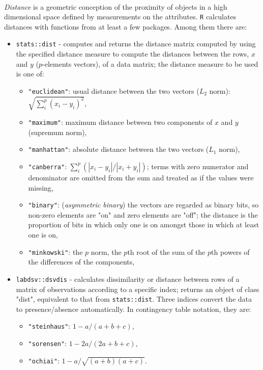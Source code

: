 \documentclass[10pt]{article}\usepackage[]{graphicx}\usepackage[]{color}
\begin{document}
\paragraph{}
\textit{Distance} is a geometric conception of the proximity of objects in 
a high dimensional space defined by measurements on the attributes. \texttt{R} 
calculates distances with functions from at least a few packages. Among them 
there are: 
\begin{itemize}
\item \texttt{stats::dist} - computes and returns the distance matrix computed 
by using the specified distance measure to compute the distances between the 
rows, $x$ and $y$ ($p$-elements vectors), of a data matrix; the distance measure 
to be used is one of: 
  \begin{itemize}
  \item \texttt{"euclidean"}:
  \newline usual distance between the two vectors ($L_2$ norm): 
  $\sqrt{\sum_{i}^{p}(x_i - y_i)^2}$,
  \item \texttt{"maximum"}:
  \newline maximum distance between two components of $x$ and 
  $y$ (supremum norm),
  \item \texttt{"manhattan"}:
  \newline absolute distance between the two vectors 
  ($L_1$ norm),
  \item \texttt{"canberra"}:
  \newline $\sum_{i}^{p}(|x_i - y_i| / |x_i + y_i|)$; 
  terms with zero numerator and denominator are omitted from the sum and treated 
  as if the values were missing,
  \item \texttt{"binary"}:
  \newline (\textit{asymmetric binary}) the vectors are regarded 
  as binary bits, so non-zero elements are "on" and zero elements are 
  "off"; the distance is the proportion of bits in which only one is on amongst 
  those in which at least one is on,
  \item \texttt{"minkowski"}:
  \newline the $p$ norm, the $p$th root of the sum of the 
  $p$th powers of the differences of the components,
  \end{itemize}
  
\item \texttt{labdsv::dsvdis} - calculates dissimilarity or distance between rows 
of a matrix of observations according to a specific index; returns an object of 
class "dist", equivalent to that from \texttt{stats::dist}.
\newline \newline Three indices convert the data to presence/absence automatically. 
In contingency table notation, they are:
    \begin{itemize}
    \item \texttt{"steinhaus"}: $1 - a/(a + b + c)$,
    \item \texttt{"sorensen"}: $1 - 2a/(2a + b + c)$,
    \item \texttt{"ochiai"}: $1 - a/ \sqrt{(a + b)  (a + c)}$.
    \end{itemize}
\end{itemize}
\end{document}

